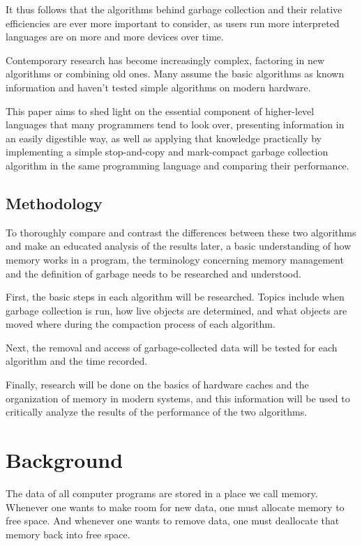 \documentclass[index]{subfiles}
\begin{document}
It thus follows that the algorithms behind garbage collection and their relative efficiencies are ever more important to consider, as users run more interpreted languages are on more and more devices over time.

Contemporary research has become increasingly complex, factoring in new algorithms or combining old ones. Many assume the basic algorithms as known information and haven't tested simple algorithms on modern hardware.

This paper aims to shed light on the essential component of higher-level languages that many programmers tend to look over, presenting information in an easily digestible way, as well as applying that knowledge practically by implementing a simple stop-and-copy and mark-compact garbage collection algorithm in the same programming language and comparing their performance.

\subsection{Methodology}

To thoroughly compare and contrast the differences between these two algorithms and make an educated analysis of the results later, a basic understanding of how memory works in a program, the terminology concerning memory management and the definition of garbage needs to be researched and understood.

First, the basic steps in each algorithm will be researched. Topics include when garbage collection is run, how live objects are determined, and what objects are moved where during the compaction process of each algorithm.

Next, the removal and access of garbage-collected data will be tested for each algorithm and the time recorded.

Finally, research will be done on the basics of hardware caches and the organization of memory in modern systems, and this information will be used to critically analyze the results of the performance of the two algorithms.

\section{Background}

The data of all computer programs are stored in a place we call memory. Whenever one wants to make room for new data, one must allocate memory to free space. And whenever one wants to remove data, one must deallocate that memory back into free space.
\end{document}
